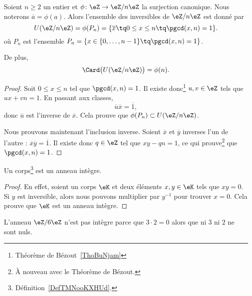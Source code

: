 \begin{proposition}     \label{PropZpintssiprempUzn}
	Soient \( n\geq 2\) un entier et \( \phi\colon \eZ\to \eZ/n\eZ\) la surjection canonique. Nous noterons \( \overline a=\phi(a)\). Alors l'ensemble des inversibles de \( \eZ/n\eZ\) est donné par
	\begin{equation}
		U(\eZ/n\eZ)=\phi(P_n)=\{ \overline x\tq 0\leq x\leq n\tq\pgcd(x,n)=1 \}.
	\end{equation}
	où \( P_n\) est l'ensemble \( P_n=\{ x\in\{ 0,\ldots,n-1 \}\tq\pgcd(x,n)=1 \}\).

	De plus,
	\begin{equation}
		\Card\big( U(\eZ/n\eZ) \big)=\phi(n).
	\end{equation}
\end{proposition}

\begin{proof}
	Soit \( 0\leq x\leq n\) tel que \( \pgcd(x,n)=1\). Il existe donc\footnote{Théorème de Bézout~\ref{ThoBuNjam}} \( u,v\in\eZ\) tels que \( ux+vn=1\). En passant aux classes,
	\begin{equation}
		\overline u\overline x=\overline 1,
	\end{equation}
	donc \( \overline u\) est l'inverse de \( \overline x\). Cela prouve que \( \phi(P_n)\subset U(\eZ/n\eZ)\).

	Nous prouvons maintenant l'inclusion inverse. Soient \( \overline x\) et \( \overline y\) inverses l'un de l'autre : \( \overline x\overline y=\overline 1\). Il existe donc \( q\in\eZ\) tel que \( xy-qn=1\), ce qui prouve\footnote{À nouveau avec le Théorème de Bézout.} que \( \pgcd(x,n)=1\).
\end{proof}

\begin{lemma}     \label{LEMooZSMEooUmSXWZ}
	Un corps\footnote{Définition~\ref{DefTMNooKXHUd}.} est un anneau intègre.
\end{lemma}

\begin{proof}
	En effet, soient un corps \( \eK\) et deux éléments \( x,y\in \eK\) tels que \( xy=0\). Si \( y\) est inversible, alors nous pouvons multiplier par \( y^{-1}\) pour trouver \( x=0\). Cela prouve que \( \eK\) est un anneau intègre.
\end{proof}


\begin{example}
	L'anneau \( \eZ/6\eZ\) n'est pas intègre parce que \( 3\cdot 2=0\) alors que ni \( 3\) ni \( 2\) ne sont nuls.
\end{example}

